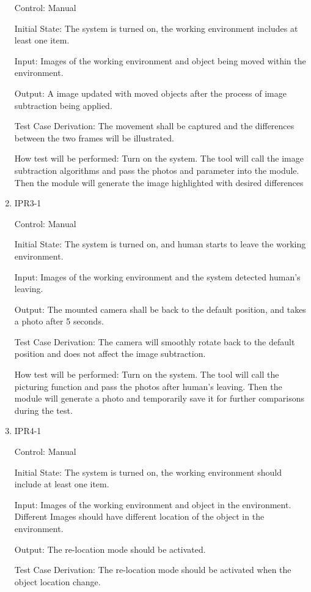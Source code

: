 \documentclass[12pt, titlepage]{article}
\begin{document}
\begin{enumerate}
Control: Manual
					
Initial State: The system is turned on, the working environment includes at least one item.
					
Input: Images of the working environment and object being moved within the environment.
					
Output: A image updated with moved objects after the process of image subtraction being applied.

Test Case Derivation: The movement shall be captured and the differences between the two frames will be illustrated.
					
How test will be performed: Turn on the system. The tool will call the image subtraction algorithms and pass the photos and parameter into the module. Then the module will generate the image highlighted with desired differences

\item{IPR3-1\\}

Control: Manual
					
Initial State: The system is turned on, and human starts to leave the working environment.
					
Input: Images of the working environment and the system detected human's leaving.
					
Output: The mounted camera shall be back to the default position, and takes a photo after 5 seconds.

Test Case Derivation: The camera will smoothly rotate back to the default position and does not affect the image subtraction.
					
How test will be performed: Turn on the system. The tool will call the picturing function and pass the photos after human's leaving. Then the module will generate a photo and temporarily save it for further comparisons during the test.

\item{IPR4-1\\}

Control: Manual
					
Initial State: The system is turned on, the working environment should include at least one item.
					
Input: Images of the working environment and object in the environment. Different Images should have different location of the object in the environment.
					
Output: The re-location mode should be activated.

Test Case Derivation: The re-location mode should be activated when the object location change.
					

\end{enumerate}
\end{document}
